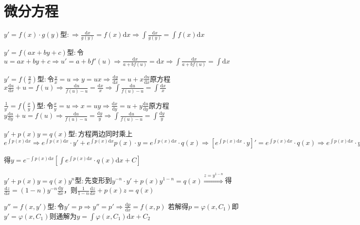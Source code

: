 \section{微分方程}

\begin{spacing}{\hangju}
    $ y' = f(x) \cdot g(y)$型$\colon \Rightarrow \frac{\mathrm{d}x}{g(y)} = f(x)\mathrm{d}x \Rightarrow \int{\frac{\mathrm{d}x}{g(y)}} = \int{f(x)}\mathrm{d}x $

    $y' = f(ax + by + c)$型$\colon$令$u = ax +by + c \Rightarrow u' = a + bf'(u) \Rightarrow \frac{\mathrm{d}x}{a + bf(u)} = \mathrm{d}x \Rightarrow \int{\frac{\mathrm{d}x}{a + bf(u)}} = \int\mathrm{d}x$

    $y' = f(\frac{y}{x})$型$\colon$令$\frac{y}{x} = u \Rightarrow y = ux \Rightarrow \frac{\mathrm{d}y}{\mathrm{d}x} = u + x\frac{\mathrm{d}u}{\mathrm{d}x}$原方程$x\frac{\mathrm{d}u}{\mathrm{d}x} + u = f(u) \Rightarrow \frac{\mathrm{d}u}{f(u)-u} = \frac{\mathrm{d}x}{x} \Rightarrow \int{\frac{\mathrm{d}u}{f(u)-u}} = \int{\frac{\mathrm{d}x}{x}}$

    $\frac{1}{y'} = f(\frac{x}{y})$型$\colon$令$\frac{x}{y} = u \Rightarrow x = uy \Rightarrow \frac{\mathrm{d}x}{\mathrm{d}y} = u + y\frac{\mathrm{d}u}{\mathrm{d}y}$原方程$y\frac{\mathrm{d}u}{\mathrm{d}y} + u = f(u) \Rightarrow \frac{\mathrm{d}u}{f(u)-u} = \frac{\mathrm{d}y}{y} \Rightarrow \int{\frac{\mathrm{d}u}{f(u)-u}} = \int{\frac{\mathrm{d}y}{y}}$

    $y' + p(x)y = q(x)$型$\colon$方程两边同时乘上$e^{\int{p(x)\mathrm{d}x}} \Rightarrow e^{\int{p(x)\mathrm{d}x}} \cdot y' + e^{\int{p(x)\mathrm{d}x}}p(x) \cdot y = e^{\int{p(x)\mathrm{d}x}} \cdot q(x) \Rightarrow \left[e^{\int{p(x)\mathrm{d}x}} \cdot y\right]' = e^{\int{p(x)\mathrm{d}x}} \cdot q(x) \Rightarrow e^{\int{p(x)\mathrm{d}x}} \cdot y = \int{e^{\int{p(x)\mathrm{d}x}} \cdot q(x)}\mathrm{d}x + C$

    \noindent 得$y = e^{-\int{p(x)\mathrm{d}x}}\left[\int{e^{\int{p(x)\mathrm{d}x}} \cdot q(x)\mathrm{d}x} + C\right]$

    $y' + p(x)y = q(x)y^n$型$\colon$先变形到$y^{-n} \cdot y' + p(x)y^{1-n} = q(x) \stackrel{z = y^{1-n}}{\Longrightarrow}$得$\frac{\mathrm{d}z}{\mathrm{d}x} = (1 - n)y^{-n}\frac{\mathrm{d}y}{\mathrm{d}x}$，则$\frac{1}{1 - n}\frac{\mathrm{d}z}{\mathrm{d}x} + p(x)z = q(x)$

    $y''=f(x, y')$型$\colon$令$y' = p \Rightarrow y'' = p' \Rightarrow \frac{\mathrm{d}p}{\mathrm{d}x} = f(x, p)$
    若解得$p = \varphi(x, C_1)$即$y' = \varphi(x, C_1)$则通解为$y = \int{\varphi(x, C_1)\mathrm{d}x} +C_2$


\end{spacing}
